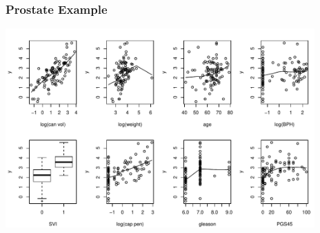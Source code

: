 \documentclass[handout]{beamer}\usepackage[]{graphicx}\usepackage[]{color}
\begin{document}
\begin{frame}
  \frametitle{Prostate Example}
  \begin{center}
 \includegraphics[height=3in]{prostfig1}

  \end{center}
\end{frame}
\end{document}
